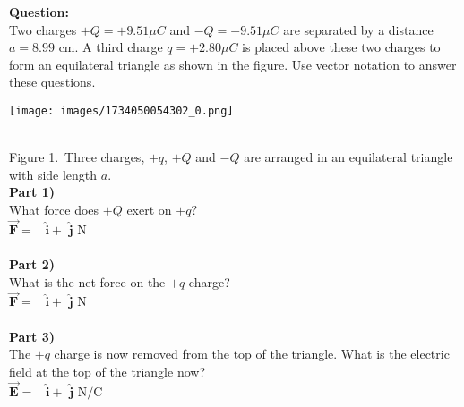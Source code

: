 \documentclass[addpoints,12pt, margin-left=35px]{exam}
\begin{document}
\textbf{Question:}\\

Two charges $+Q = +{9.51} \mu C$ and $-Q = - {9.51} \mu C$ are separated by a distance $a = {8.99} \text{ cm.}$ A third charge $ q =+ {2.80} \mu C$ is placed above these two charges to form an equilateral triangle as shown in the figure. Use vector notation to answer these questions.\\

\begin{center}
\texttt{[image: images/1734050054302\_0.png]}
\end{center}\\

Figure 1. Three charges, $+q$, $+Q$ and $-Q$ are arranged in an equilateral triangle with side length $a$.\\

\textbf{Part 1)}\\

What force does $+ Q$ exert on $+q?$\\

$\mathbf{\vec{F}} = $  \underline{\hspace{3cm}}  $ \mathbf{\hat{i}} + $  \underline{\hspace{3cm}}  $\mathbf{\hat{j}} \text{ N}$ \\

\\

\textbf{Part 2)}\\

What is the net force on the $+ q$ charge?\\

$\mathbf{\vec{F}} = $  \underline{\hspace{3cm}}  $ \mathbf{\hat{i}} + $  \underline{\hspace{3cm}}  $\mathbf{\hat{j}} \text{ N}$ \\

\\

\textbf{Part 3)}\\

The $+q$ charge is now removed from the top of the triangle. What is the electric field at the top of the triangle now?\\

$\mathbf{\vec{E}} = $  \underline{\hspace{3cm}}  $ \mathbf{\hat{i}} + $  \underline{\hspace{3cm}}  $\mathbf{\hat{j}} \text{ N/C}$ \\
\end{document}
